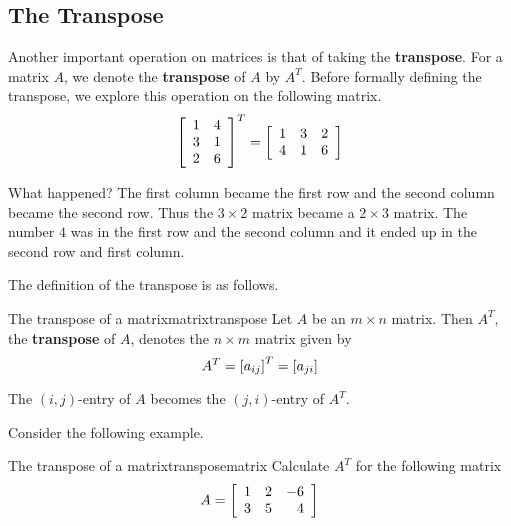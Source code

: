 \subsection{The Transpose}

Another important operation on matrices is that of taking the \textbf{transpose}. For a matrix $A$, we denote the
\textbf{transpose} of $A$ by $A^T$. Before formally defining the transpose, we explore this
operation on the following matrix.
\begin{equation*}
\left[
\begin{array}{cc}
1 & 4 \\
3 & 1 \\
2 & 6
\end{array}
\right] ^{T}=\allowbreak \left[
\begin{array}{ccc}
1 & 3 & 2 \\
4 & 1 & 6
\end{array}
\right]
\end{equation*}

What happened? The first column became the first row and the second column
became the second row. Thus the $3\times 2$ matrix became a $2\times 3$
matrix. The number $4$ was in the first row and the second column and it
ended up in the second row and first column. 

The definition of the transpose is as follows.

\begin{definition}{The transpose of a matrix}{matrixtranspose}
Let $A$ be an $m\times n$ matrix. Then $A^{T}$, the \textbf{transpose} of $A$,  denotes the $n\times m$
matrix given by 
\begin{equation*}
A^{T} = \left[ a _{ij}\right] ^{T}= \left[ a_{ji} \right]
\end{equation*}
\end{definition}

The $\left( i, j  \right)$-entry of $A$ becomes the 
$\left( j,i \right)$-entry of $A^T$. 

Consider the following example.

\begin{example}{The transpose of a matrix}{transposematrix}
Calculate $A^T$ for the following matrix
\begin{equation*}
A = \left[
\begin{array}{rrr}
1 & 2 & -6 \\
3 & 5 & 4
\end{array}
\right]
\end{equation*}
\end{example}

